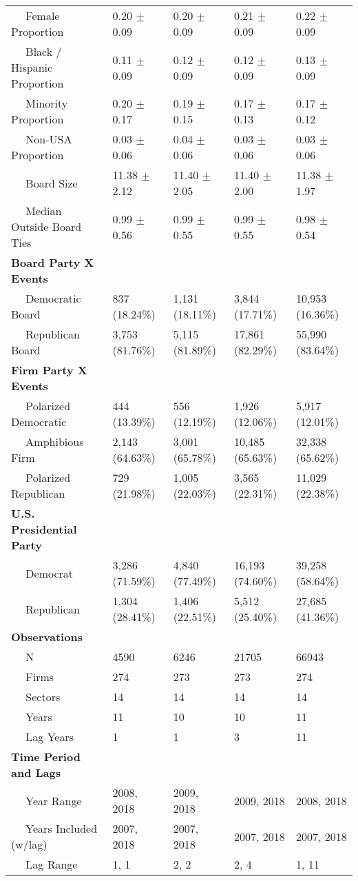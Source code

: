 \begin{tabular}{lllll}
~~ Female Proportion & 0.20 $\pm$ 0.09 & 0.20 $\pm$ 0.09 & 0.21 $\pm$ 0.09 & 0.22 $\pm$ 0.09\\
~~ Black / Hispanic Proportion & 0.11 $\pm$ 0.09 & 0.12 $\pm$ 0.09 & 0.12 $\pm$ 0.09 & 0.13 $\pm$ 0.09\\
~~ Minority Proportion & 0.20 $\pm$ 0.17 & 0.19 $\pm$ 0.15 & 0.17 $\pm$ 0.13 & 0.17 $\pm$ 0.12\\
~~ Non-USA Proportion & 0.03 $\pm$ 0.06 & 0.04 $\pm$ 0.06 & 0.03 $\pm$ 0.06 & 0.03 $\pm$ 0.06\\
\addlinespace
~~ Board Size & 11.38 $\pm$ 2.12 & 11.40 $\pm$ 2.05 & 11.40 $\pm$ 2.00 & 11.38 $\pm$ 1.97\\
~~ Median Outside Board Ties & 0.99 $\pm$ 0.56 & 0.99 $\pm$ 0.55 & 0.99 $\pm$ 0.55 & 0.98 $\pm$ 0.54\\
\bf{Board Party X Events} & ~ & ~ & ~ & ~\\
~~ Democratic Board & 837 (18.24\%) & 1,131 (18.11\%) & 3,844 (17.71\%) & 10,953 (16.36\%)\\
~~ Republican Board & 3,753 (81.76\%) & 5,115 (81.89\%) & 17,861 (82.29\%) & 55,990 (83.64\%)\\
\addlinespace
\bf{Firm Party X Events} & ~ & ~ & ~ & ~\\
~~ Polarized Democratic & 444 (13.39\%) & 556 (12.19\%) & 1,926 (12.06\%) & 5,917 (12.01\%)\\
~~ Amphibious Firm & 2,143 (64.63\%) & 3,001 (65.78\%) & 10,485 (65.63\%) & 32,338 (65.62\%)\\
~~ Polarized Republican & 729 (21.98\%) & 1,005 (22.03\%) & 3,565 (22.31\%) & 11,029 (22.38\%)\\
\bf{U.S. Presidential Party} & ~ & ~ & ~ & ~\\
\addlinespace
~~ Democrat & 3,286 (71.59\%) & 4,840 (77.49\%) & 16,193 (74.60\%) & 39,258 (58.64\%)\\
~~ Republican & 1,304 (28.41\%) & 1,406 (22.51\%) & 5,512 (25.40\%) & 27,685 (41.36\%)\\
\bf{Observations} & ~ & ~ & ~ & ~\\
~~ N & 4590 & 6246 & 21705 & 66943\\
~~ Firms & 274 & 273 & 273 & 274\\
\addlinespace
~~ Sectors & 14 & 14 & 14 & 14\\
~~ Years & 11 & 10 & 10 & 11\\
~~ Lag Years & 1 & 1 & 3 & 11\\
\bf{Time Period and Lags} & ~ & ~ & ~ & ~\\
~~ Year Range & 2008, 2018 & 2009, 2018 & 2009, 2018 & 2008, 2018\\
\addlinespace
~~ Years Included (w/lag) & 2007, 2018 & 2007, 2018 & 2007, 2018 & 2007, 2018\\
~~ Lag Range & 1, 1 & 2, 2 & 2, 4 & 1, 11\\
\bottomrule
\end{tabular}

